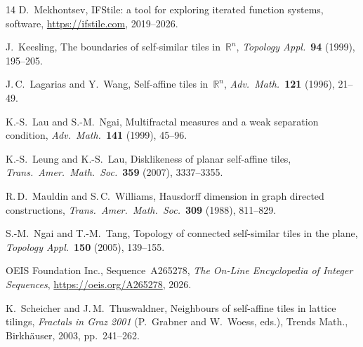 \documentclass{amsart}
\theoremstyle{definition}
\theoremstyle{remark}
\newcommand{\R}{\mathbb{R}}
\begin{document}
\begin{thebibliography}{14}
D.~Mekhontsev,
IFStile: a tool for exploring iterated function systems,
software, \url{https://ifstile.com}, 2019--2026.

J.~Keesling,
The boundaries of self-similar tiles in~$\R^n$,
\emph{Topology Appl.}\ \textbf{94} (1999), 195--205.

J.\,C.~Lagarias and Y.~Wang,
Self-affine tiles in~$\R^n$,
\emph{Adv.\ Math.}\ \textbf{121} (1996), 21--49.

K.-S.~Lau and S.-M.~Ngai,
Multifractal measures and a weak separation condition,
\emph{Adv.\ Math.}\ \textbf{141} (1999), 45--96.

K.-S.~Leung and K.-S.~Lau,
Disklikeness of planar self-affine tiles,
\emph{Trans.\ Amer.\ Math.\ Soc.}\ \textbf{359} (2007), 3337--3355.

R.\,D.~Mauldin and S.\,C.~Williams,
Hausdorff dimension in graph directed constructions,
\emph{Trans.\ Amer.\ Math.\ Soc.}\ \textbf{309} (1988), 811--829.

S.-M.~Ngai and T.-M.~Tang,
Topology of connected self-similar tiles in the plane,
\emph{Topology Appl.}\ \textbf{150} (2005), 139--155.

OEIS Foundation Inc.,
Sequence~A265278,
\emph{The On-Line Encyclopedia of Integer Sequences},
\url{https://oeis.org/A265278}, 2026.

K.~Scheicher and J.\,M.~Thuswaldner,
Neighbours of self-affine tiles in lattice tilings,
\emph{Fractals in Graz 2001} (P.~Grabner and W.~Woess, eds.),
Trends Math., Birkh{\"a}user, 2003, pp.~241--262.

\end{thebibliography}
\end{document}
